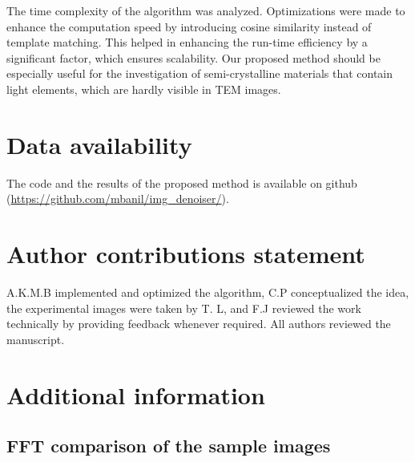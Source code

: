 \documentclass[fleqn,10pt]{wlscirep}
\begin{document}
	The time complexity of the algorithm was analyzed. Optimizations were made to enhance the computation speed by introducing cosine similarity instead of template matching. This helped in enhancing the run-time efficiency by a significant factor, which ensures scalability. Our proposed method should be especially useful for the investigation of semi-crystalline materials that contain light elements, which are hardly visible in TEM images.  
	
	\section*{Data availability}
	
	The code and the results of the proposed method is available on github (\url{https://github.com/mbanil/img_denoiser/}).
	
	

	
	
	\section*{Author contributions statement}
	
	A.K.M.B implemented and optimized the algorithm, C.P conceptualized the idea, the experimental images were taken by T. L, and F.J reviewed the work technically by providing feedback whenever required.  All authors reviewed the manuscript. 
	
	\section*{Additional information}
	
	\subsection*{FFT comparison of the sample images}
	\label{fftcomparison}
	
\end{document}
